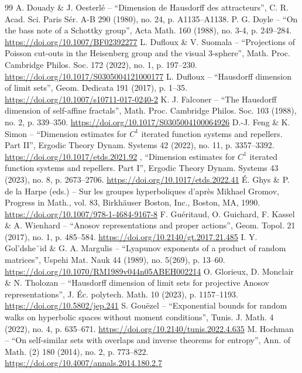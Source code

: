 \begin{thebibliography}{99}
 A. Douady \& J. Oesterlé – “Dimension de Hausdorff des attracteurs”, C. R. Acad. Sci. Paris Sér. A-B 290 (1980), no. 24, p. A1135–A1138. 
 P. G. Doyle – “On the bass note of a Schottky group”, Acta Math. 160 (1988), no. 3-4, p. 249–284. \url{https://doi.org/10.1007/BF02392277}
 L. Dufloux \& V. Suomala – “Projections of Poisson cut-outs in the Heisenberg group and the visual 3-sphere”, Math. Proc. Cambridge Philos. Soc. 172 (2022), no. 1, p. 197–230. \url{https://doi.org/10.1017/S0305004121000177}
 L. Dufloux – “Hausdorff dimension of limit sets”, Geom. Dedicata 191 (2017), p. 1–35. \url{https://doi.org/10.1007/s10711-017-0240-2}
 K. J. Falconer – “The Hausdorff dimension of self-affine fractals”, Math. Proc. Cambridge Philos. Soc. 103 (1988), no. 2, p. 339–350. \url{https://doi.org/10.1017/S0305004100064926}
 D.-J. Feng \& K. Simon – “Dimension estimates for $C^1$ iterated function systems and repellers. Part II”, Ergodic Theory Dynam. Systems 42 (2022), no. 11, p. 3357–3392. \url{https://doi.org/10.1017/etds.2021.92}
 \textemdash{}, “Dimension estimates for $C^1$ iterated function systems and repellers. Part I”, Ergodic Theory Dynam. Systems 43 (2023), no. 8, p. 2673–2706. \url{https://doi.org/10.1017/etds.2022.41}
 É. Ghys \& P. de la Harpe (eds.) – Sur les groupes hyperboliques d’après Mikhael Gromov, Progress in Math., vol. 83, Birkhäuser Boston, Inc., Boston, MA, 1990. \url{https://doi.org/10.1007/978-1-4684-9167-8}
 F. Guéritaud, O. Guichard, F. Kassel \& A. Wienhard – “Anosov representations and proper actions”, Geom. Topol. 21 (2017), no. 1, p. 485–584. \url{https://doi.org/10.2140/gt.2017.21.485}
 I. Y. Gol’dshe˘id \& G. A. Margulis – “Lyapunov exponents of a product of random matrices”, Uspehi Mat. Nauk 44 (1989), no. 5(269), p. 13–60. \url{https://doi.org/10.1070/RM1989v044n05ABEH002214}
 O. Glorieux, D. Monclair \& N. Tholozan – “Hausdorff dimension of limit sets for projective Anosov representations”, J. Éc. polytech. Math. 10 (2023), p. 1157–1193. \url{https://doi.org/10.5802/jep.241}
 S. Gouëzel – “Exponential bounds for random walks on hyperbolic spaces without moment conditions”, Tunis. J. Math. 4 (2022), no. 4, p. 635–671. \url{https://doi.org/10.2140/tunis.2022.4.635}
 M. Hochman – “On self-similar sets with overlaps and inverse theorems for entropy”, Ann. of Math. (2) 180 (2014), no. 2, p. 773–822. \url{https://doi.org/10.4007/annals.2014.180.2.7}

\end{thebibliography}

